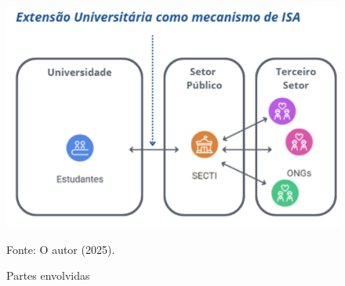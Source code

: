 \begin{figure}[H]
    \caption{Partes envolvidas}
    \centering
    \includegraphics[width=0.6\linewidth]{images/metodologia/partesenvolvidas.png}
    \label{fig:partesenvolvidas}
    \vspace{0.2cm}

{\centering Fonte: O autor (2025). \par}
\end{figure}